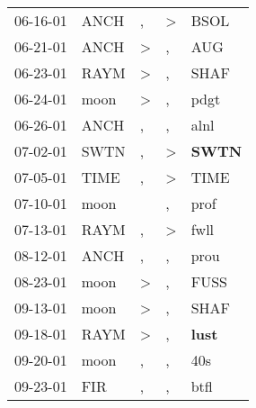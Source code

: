 \begin{supertabular}{p{0.07\textwidth}p{0.06\textwidth}p{0.02\textwidth}p{0.02\textwidth}p{0.06\textwidth}}
 06-16-01\textsuperscript{} &           ANCH\textsuperscript{} &                , &     \textgreater &           BSOL\textsuperscript{} \\
 06-21-01\textsuperscript{} &           ANCH\textsuperscript{} &     \textgreater &                , &            AUG\textsuperscript{} \\
 06-23-01\textsuperscript{} &           RAYM\textsuperscript{} &     \textgreater &                , &           SHAF\textsuperscript{} \\
 06-24-01\textsuperscript{} &           moon\textsuperscript{} &     \textgreater &                , &           pdgt\textsuperscript{} \\
 06-26-01\textsuperscript{} &           ANCH\textsuperscript{} &                , &                , &           alnl\textsuperscript{} \\
 07-02-01\textsuperscript{} &           SWTN\textsuperscript{} &                , &     \textgreater &  \textbf{SWTN\textsuperscript{}} \\
 07-05-01\textsuperscript{} &           TIME\textsuperscript{} &                , &     \textgreater &           TIME\textsuperscript{} \\
 07-10-01\textsuperscript{} &           moon\textsuperscript{} &                  &                , &           prof\textsuperscript{} \\
 07-13-01\textsuperscript{} &           RAYM\textsuperscript{} &                , &     \textgreater &           fwll\textsuperscript{} \\
 08-12-01\textsuperscript{} &           ANCH\textsuperscript{} &                , &                , &           prou\textsuperscript{} \\
 08-23-01\textsuperscript{} &           moon\textsuperscript{} &     \textgreater &                , &           FUSS\textsuperscript{} \\
 09-13-01\textsuperscript{} &           moon\textsuperscript{} &     \textgreater &                , &           SHAF\textsuperscript{} \\
 09-18-01\textsuperscript{} &           RAYM\textsuperscript{} &     \textgreater &                , &  \textbf{lust\textsuperscript{}} \\
 09-20-01\textsuperscript{} &           moon\textsuperscript{} &                , &                , &            40s\textsuperscript{} \\
 09-23-01\textsuperscript{} &            FIR\textsuperscript{} &                , &                , &           btfl\textsuperscript{} \\

\end{supertabular}
